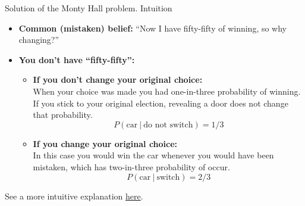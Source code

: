 \documentclass[aspectratio=169]{beamer}
\begin{document}
\begin{frame}{Solution of the Monty Hall problem. Intuition}
    
    \begin{itemize}
        \item \textbf{Common (mistaken) belief:} ``Now I have fifty-fifty of winning, so why changing?''
        \item \textbf{You don't have ``fifty-fifty'':} 
        \begin{itemize}
            \item[$\bullet$] \textbf{If you don't change your original choice:} \\
            When your choice was made you had one-in-three probability of winning. If you stick to your original election, revealing a door does not change that probability.
            $$
            P(\text{car}\ |\ \text{do not switch}) = 1/3
            $$
            \item[$\bullet$] \textbf{If you change your original choice:} \\ 
            In this case you would win the car whenever you would have been mistaken, which has two-in-three probability of occur.
            $$
            P(\text{car}\ |\ \text{switch}) = 2/3
            $$
        \end{itemize}
    \end{itemize}
    \vspace{0.2cm}

    \begin{center}
        See a more intuitive explanation \href{https://www.youtube.com/watch?v=DlphpbxNTLw}{here}.
    \end{center}
\end{frame}
\end{document}
